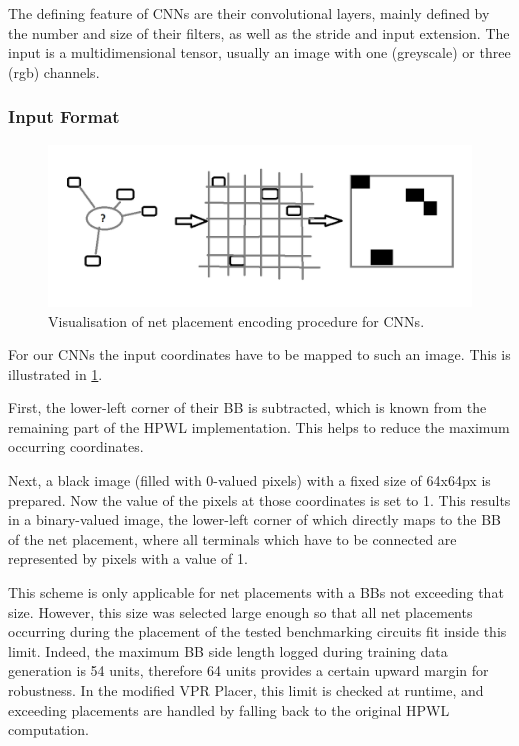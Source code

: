 The defining feature of \glspl{CNN} are their convolutional layers, mainly defined by the number and size of their filters, as well as the stride and input extension. The input is a multidimensional tensor, usually an image with one (greyscale) or three (rgb) channels.

\subsubsection{Input Format}

\begin{figure}
	\includegraphics[width=\linewidth]{plots/cnn-encoding.png}
	\caption{Visualisation of net placement encoding procedure for \glspl{CNN}.}
	\label{fig:cnn-encoding}
\end{figure}

For our \glspl{CNN} the input coordinates have to be mapped to such an image. This is illustrated in \ref{fig:cnn-encoding}.

First, the lower-left corner of their \gls{BB} is subtracted, which is known from the remaining part of the \gls{HPWL} implementation. This helps to reduce the maximum occurring coordinates.

Next, a black image (filled with 0-valued pixels) with a fixed size of 64x64px is prepared. Now the value of the pixels at those coordinates is set to 1. This results in a binary-valued image, the lower-left corner of which directly maps to the \gls{BB} of the net placement, where all terminals which have to be connected are represented by pixels with a value of 1.

This scheme is only applicable for net placements with a \glspl{BB} not exceeding that size. However, this size was selected large enough so that all net placements occurring during the placement of the tested benchmarking circuits fit inside this limit. Indeed, the maximum \gls{BB} side length logged during training data generation is 54 units, therefore 64 units provides a certain upward margin for robustness. In the modified \gls{VPR} Placer, this limit is checked at runtime, and exceeding placements are handled by falling back to the original \gls{HPWL} computation.

